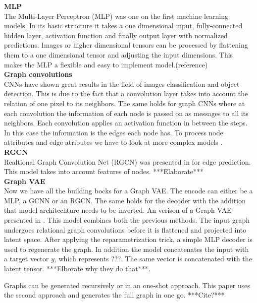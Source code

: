 \textbf{MLP}\\
The Multi-Layer Perceptron (MLP) was one on the first machine learning models. In its basic structure it takes a one dimensional input, fully-connected hidden layer, activation function and finally output layer with normalized predictions.
Images or higher dimensional tensors can be processed by flattening them to a one dimensional tensor and adjusting the input dimensions. This makes the MLP a flexible and easy to implement model.(reference)
\\
\textbf{Graph convolutions}\\
CNNs have shown great results in the field of images classification and object detection. This is due to the fact that a convolution layer takes into account the relation of one pixel to its neighbors. The same holds for graph CNNs where at each convolution the information of each node is passed on as messages to all its neighbors. Each convolution applies an activation function in between the steps. In this case the information is the edges each node has. To process node attributes and edge atributes we have to look at more complex models \cite{tiao_variational_nodate}. 
\\
\textbf{RGCN}\\
Realtional Graph Convolution Net (RGCN) was presented in \cite{kipf_semi-supervised_2017} for edge prediction. This model takes into account features of nodes. ***Elaborate***
\\
\textbf{Graph VAE}\\
Now we have all the building bocks for a Graph VAE. The encode can either be a MLP, a GCNN or an RGCN. The same holds for the decoder with the addition that model architechture needs to be inverted. An verison of a Graph VAE presented in \cite{simonovsky_graphvae_2018}. This model combines both the previous methods. The input graph undergoes relational graph convolutions before it is flattened and projected into latent space. After applying the reparametrization trick, a simple MLP decoder is used to regenerate the graph. In addition the model concatenates the input with a target vector $y$, which represents ???. The same vector is concatenated with the latent tensor. ***Elborate why they do that***.

Graphs can be generated recursively or in an one-shot approach. This paper uses the second approach and generates the full graph in one go. ***Cite?***




